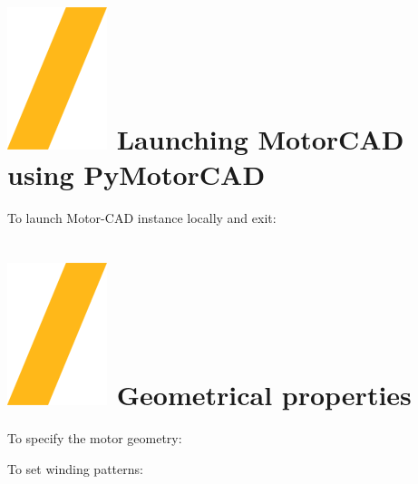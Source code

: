 \documentclass[landscape]{article}
\begin{document}
\begin{multicols}{3}
\setlength{\premulticols}{1pt}
\setlength{\postmulticols}{1pt}
\setlength{\multicolsep}{1pt}
\setlength{\columnsep}{2pt}

\section{\includegraphics[height=\fontcharht\font`\S]{slash.png} Launching MotorCAD using PyMotorCAD}
To launch Motor-CAD instance locally and exit:



\section{\includegraphics[height=\fontcharht\font`\S]{slash.png} Geometrical properties}
To specify the motor geometry:

To set winding patterns:


\end{multicols}
\end{document}

